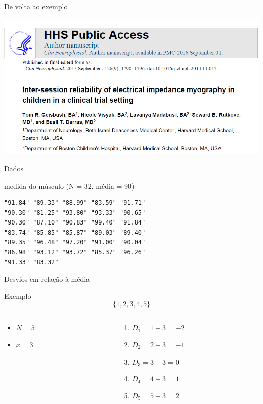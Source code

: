 \documentclass{beamer}
\begin{document}
\begin{frame}{De volta ao exemplo}
  \begin{center}
    \includegraphics[width=1.2\textwidth]{Cap3/DP1}
  \end{center}
\end{frame}

\begin{frame}[fragile]{Dados}
  \begin{block}{medida do músculo (N = 32, média = 90)}
\begin{verbatim}
"91.84" "89.33" "88.99" "83.59" "91.71"
"90.30" "81.25" "93.80" "93.33" "90.65"
"90.30" "87.10" "90.83" "99.40" "91.84"
"83.74" "85.85" "85.87" "89.03" "89.40"
"89.35" "96.48" "97.20" "91.00" "90.04"
"86.98" "93.12" "93.72" "85.37" "96.26"
"91.33" "83.32"
\end{verbatim}
  \end{block}
\end{frame}

\begin{frame}{Desvios em relação à média}
\begin{exampleblock}{Exemplo}
  \begin{displaymath}
    \{1,2,3,4,5\}
  \end{displaymath}

  \begin{columns}
    \begin{column}{5cm}
  \begin{itemize}
  \item $N=5$
  \item $\bar{x} = 3$
  \end{itemize}
\end{column}
\begin{column}{5cm}
  \begin{enumerate}
  \item $D_1 = 1-3 = -2$
  \item $D_2 = 2-3 = -1$
  \item $D_3 = 3-3 = 0$
  \item $D_4 = 4-3 = 1$
  \item $D_5 = 5-3 = 2$
  \end{enumerate}
\end{column}
\end{columns}
\end{exampleblock}
\end{frame}
\end{document}
